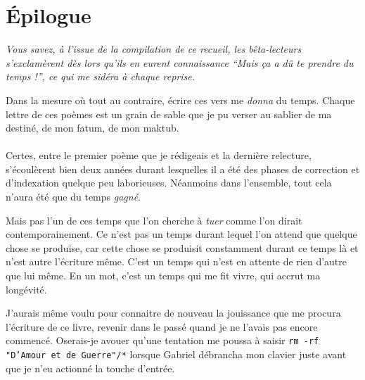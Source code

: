 \section*{Épilogue}
\thispagestyle{empty}
%
%
%
{\em\small
  Vous savez, à l’issue de la compilation de ce recueil, les bêta-lecteurs s’exclamèrent dès lors qu’ils en eurent connaissance \enquote{Mais ça a dû te \emph{prendre} du temps !}, ce qui me sidéra à chaque reprise.

  Dans la mesure où tout au contraire, écrire ces vers me \emph{donna} du temps. Chaque lettre de ces poèmes est un grain de sable que je pu verser au sablier de ma destiné, de mon fatum, de mon maktub.

  \paragraph{}
  Certes, entre le premier poème que je rédigeais et la dernière relecture, s’écoulèrent bien deux années durant lesquelles il a été des phases de correction et d’indexation quelque peu laborieuses. Néanmoins dans l’ensemble, tout cela n’aura été que du temps \emph{gagné}.

  Mais pas l’un de ces temps que l’on cherche à \emph{tuer} comme l’on dirait contemporainement. 
  Ce n’est pas un temps durant lequel l’on attend que quelque chose se produise, car cette chose se produisit constamment durant ce temps là et n’est autre l’écriture même. C’est un temps qui n’est en attente de rien d’autre que lui même. En un mot, c’est un temps qui me fit vivre, qui accrut ma longévité.

  J’aurais même voulu pour connaitre de nouveau la jouissance que me procura l’écriture de ce livre, revenir dans le passé quand je ne l’avais pas encore commencé.
  Oserais-je avouer qu’une tentation me poussa à saisir \texttt{rm -rf "D’Amour et de Guerre"/*} lorsque Gabriel débrancha mon clavier juste avant que je n’eu actionné la touche d’entrée.

}
